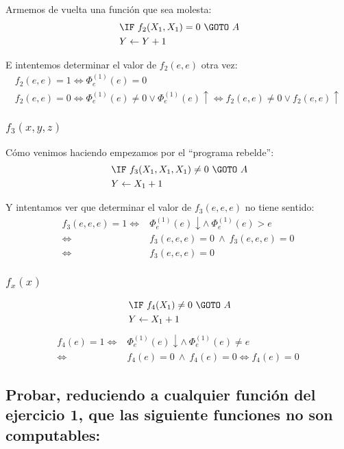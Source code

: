 \documentclass[fleqn, 11pt]{article}
\newcommand{\indef}{\uparrow}
\newcommand{\ddef}{\downarrow}
\newcommand{\into}{\leftarrow}
\begin{document}
Armemos de vuelta una función que sea molesta:
\begin{align*}
	[A]\ &\IF\ f_2(X_1, X_1) = 0\ \GOTO\ A \\
	     &Y \into Y + 1
\end{align*}

E intentemos determinar el valor de $f_2(e, e)$ otra vez:
\begin{gather*}
	f_2(e, e) = 1 \iff \Phi^{(1)}_e(e) = 0 \\
	f_2(e, e) = 0
	\iff \Phi^{(1)}_e(e) \neq 0 \lor \Phi^{(1)}_e(e) \indef
	\iff f_2(e, e) \neq 0 \lor f_2(e, e) \indef
\end{gather*}

\subsubsection{$f_3(x, y, z)$}

Cómo venimos haciendo empezamos por el ``programa rebelde'':
\begin{align*}
	[A]\ &\IF\ f_3(X_1, X_1, X_1) \neq 0\ \GOTO\ A \\
	     &Y \into X_1 + 1
\end{align*}

Y intentamos ver que determinar el valor de $f_3(e, e, e)$ no tiene sentido:
\begin{align*}
	f_3(e, e, e) = 1
	\iff& \Phi^{(1)}_e(e) \ddef \land\ \Phi^{(1)}_e(e) > e \\
	\iff& f_3(e, e, e) = 0\ \land\ f_3(e, e, e) = 0 \\
	\iff& f_3(e, e, e) = 0
\end{align*}

\subsubsection{$f_x(x)$}

\begin{align*}
	[A]\ &\IF\ f_4(X_1) \neq 0\ \GOTO\ A \\
	     &Y \into X_1 + 1
\end{align*}
\begin{align*}
	f_4(e) = 1
	\iff& \Phi^{(1)}_e(e) \ddef \land\ \Phi^{(1)}_e(e) \neq e \\
	\iff& f_4(e) = 0\ \land\ f_4(e) = 0 \iff f_4(e) = 0
\end{align*}

\subsection{Probar, reduciendo a cualquier función del ejercicio 1, que las
siguiente funciones no son computables:}
\end{document}
